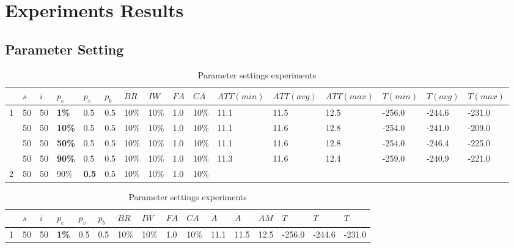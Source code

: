 \chapter{Experiments Results}
\label{appendixC}

\section{Parameter Setting}

\begin{sidewaystable}
    \centering
	\begin{tabular}{|l|l|l|l|l|l|l|l|l|l||l|l|l|l|l|l|}
 	\hline
 	~ & $s$ & $i$ & $p_{e}$ & $p_{v}$ & $p_{b}$ & $BR$ &$IW$ & $FA$ & $CA$ &  $ATT(min)$ & $ATT(avg)$ & $ATT(max)$ & $T(min)$ & $T(avg)$ & $T(max)$\\
 	\hline
    1 & 50 & 50 & \textbf{1\%} & 0.5 & 0.5 & 10\% & 10\% & 1.0 & 10\% & 11.1 & 11.5 & 12.5 & -256.0 &-244.6 & -231.0  \\
    ~ & 50 & 50 & \textbf{10\%} & 0.5 & 0.5 & 10\% & 10\% & 1.0 & 10\% & 11.1 & 11.6 & 12.8 & -254.0 & -241.0 & -209.0 \\
    ~ & 50 & 50 & \textbf{50\%} & 0.5 & 0.5 & 10\% & 10\% & 1.0 & 10\% & 11.1 & 11.6 & 12.8 & -254.0 & -246.4 & -225.0\\
    ~ & 50 & 50 & \textbf{90\%} & 0.5 & 0.5 & 10\% & 10\% & 1.0 & 10\% &  11.3 & 11.6 & 12.4 & -259.0 & -240.9 & -221.0  \\
    \hline
    2 & 50 & 50 & 90\% & \textbf{0.5} & 0.5 & 10\% & 10\% & 1.0 & 10\% &  ~ & ~ & ~ & ~ & ~ & ~  \\
	\hline
    \end{tabular}
    \caption {Parameter settings experiments}
    \label{table:parameterSettings}
\end{sidewaystable}


\begin{table}
    
    \hspace*{-2cm}
	\begin{tabular}{|l|l|l|l|l|l|l|l|l|l||l|l|l|l|l|l|}
 	\hline
 	~ & $s$ & $i$ & $p_{e}$ & $p_{v}$ & $p_{b}$ & $BR$ &$IW$ & $FA$ & $CA$ & $A$ & $A$ & $AM$ & $T$ & $T$ & $T$\\
 	\hline
    1 & 50 & 50 & \textbf{1\%} & 0.5 & 0.5 & 10\% & 10\% & 1.0 & 10\% & 11.1 & 11.5 & 12.5 & -256.0 &-244.6 & -231.0  \\
	\hline
    \end{tabular}
    \caption {Parameter settings experiments}
    \label{table:parameterSettingsLALLA}
\end{table}

